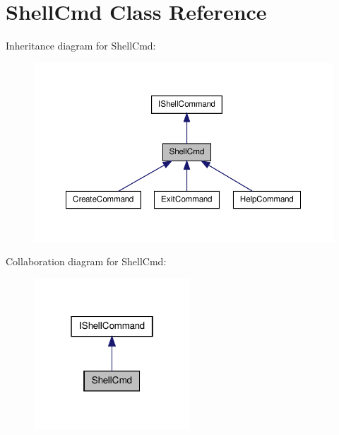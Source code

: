 \hypertarget{class_sec_plus_1_1_shell_cmd}{
\section{ShellCmd Class Reference}
\label{class_sec_plus_1_1_shell_cmd}
}


Inheritance diagram for ShellCmd:
\nopagebreak
\begin{figure}[H]
\begin{center}
\leavevmode
\includegraphics[width=366pt]{class_sec_plus_1_1_shell_cmd__inherit__graph}
\end{center}
\end{figure}


Collaboration diagram for ShellCmd:\nopagebreak
\begin{figure}[H]
\begin{center}
\leavevmode
\includegraphics[width=166pt]{class_sec_plus_1_1_shell_cmd__coll__graph}
\end{center}
\end{figure}
